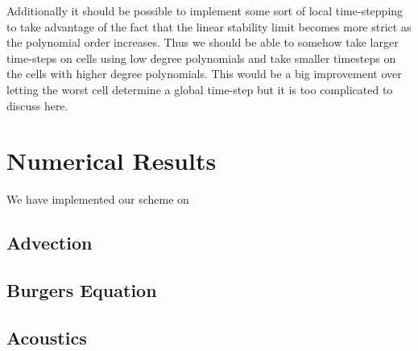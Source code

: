 \documentclass[10]{amsart}
\begin{document}
Additionally it should be possible to implement some sort of local time-stepping to take
advantage of the fact that the linear stability limit becomes more strict as the polynomial order increases.
Thus we should be able to somehow take larger time-steps on cells using low degree polynomials
and take smaller timesteps on the cells with higher degree polynomials. This would be a big improvement
over letting the worst cell determine a global time-step but it is too complicated to discuss here.

\section{Numerical Results}

We have implemented our scheme on 

\subsection{Advection}

\subsection{Burgers Equation}

\subsection{Acoustics}





\end{document}
